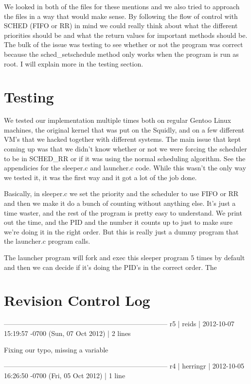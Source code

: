 \documentclass[letterpaper,10pt]{article}
\begin{document}
We looked in both of the files for these mentions and we also tried to approach the files in a way that would make sense. By following the flow of control with SCHED (FIFO or RR) in mind we could really think about what the different priorities should be and what the return values for important methods should be. The bulk of the issue was testing to see whether or not the program was correct because the sched\_setschedule method only works when the program is run as root. I will explain more in the testing section.

\section{Testing}
We tested our implementation multiple times both on regular Gentoo Linux machines, the original kernel that was put on the Squidly, and on a few different VM's that we hacked together with different systems. The main issue that kept coming up was that we didn't know whether or not we were forcing the scheduler to be in SCHED\_RR or if it was using the normal scheduling algorithm. See the appendicies for the sleeper.c and launcher.c code. While this wasn't the only way we tested it, it was the first way and it got a lot of the job done.  

Basically, in sleeper.c we set the priority and the scheduler to use FIFO or RR and then we make it do a bunch of counting without anything else. It's just a time waster, and the rest of the program is pretty easy to understand. We print out the time, and the PID and the number it counts up to just to make sure we're doing it in the right order. But this is really just a dummy program that the launcher.c program calls. 

The launcher program will fork and exec this sleeper program 5 times by default and then we can decide if it's doing the PID's in the correct order. The  

\section{Revision Control Log}

------------------------------------------------------------------------
r5 | reids | 2012-10-07 15:19:57 -0700 (Sun, 07 Oct 2012) | 2 lines

Fixing our typo, missing a variable

------------------------------------------------------------------------
r4 | herringr | 2012-10-05 16:26:50 -0700 (Fri, 05 Oct 2012) | 1 line
\end{document}
